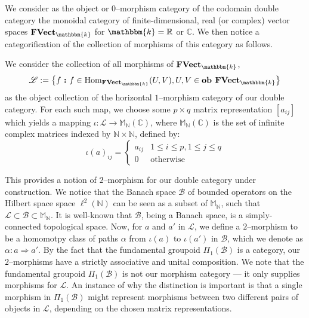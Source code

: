 \documentclass{amsart}
\newcommand{\M}{\mathbb{M}}
\newcommand{\N}{\mathbb{N}}
\newcommand{\R}{\mathbb{R}}
\newcommand{\C}{\mathbb{C}}
\newcommand{\K}{\mathbbm{k}}
\newcommand{\s}{\mathscr}
\renewcommand{\to}[1][]{\stackrel{#1}{\longrightarrow}}
\newcommand{\To}[1][]{\stackrel{#1}{\Longrightarrow}}
\newcommand{\curly}[1]{\left\{ #1 \right\}}
\newcommand{\set}[2][]{\ifthenelse{\equal{#1}{}}
                                  {\curly{#2}}
                                  {\curly{#1\ \textbf{:}\ #2}}}
\newcommand{\FVect}{\textbf{FVect}}
\newcommand{\Hom}{\text{Hom}}
\newcommand{\Ob}{\textbf{ob }}
\numberwithin{thm}{section}
\theoremstyle{definition}
\begin{document}
We consider as the object or $0$--morphism category of the codomain double
category the monoidal category of finite-dimensional, real (or complex) vector
spaces $\FVect_{\K}$ for $\K = \R$ or $\C$. We then notice a categorification
of the collection of morphisms of this category as follows.

We consider the collection of all morphisms of $\FVect_{\K}$,
\[
  \s{L} := \set[f]{f \in \Hom_{\FVect_{\K}}(U, V), U, V \in \Ob \FVect_{\K}}
\]
as the object collection of the horizontal $1$--morphism category of our double
category. For each such map, we choose some $p \times q$ matrix representation
$[a_{ij}]$ which yields a mapping $\iota : \s{L} \to \M_{\N}(\C)$, where
$\M_{\N}(\C)$ is the set of infinite complex matrices indexed by $\N \times \N$,
defined by:
\[
  \iota(a)_{ij} = \begin{cases}
    a_{ij} & 1 \leq i \leq p, 1 \leq j \leq q \\
    0      & \text{otherwise}
  \end{cases}
\]

This provides a notion of $2$--morphism for our double category under
construction. We notice that the Banach space $\s{B}$ of bounded operators on
the Hilbert space space $\ell^2(\N)$ can be seen as a subset of $\M_{\N}$, such
that $\s{L} \subset \s{B} \subset \M_{\N}$. It is well-known that $\s{B}$, being
a Banach space, is a simply-connected topological space. Now, for $a$ and $a'$
in $\s{L}$, we define a $2$--morphism to be a homomotpy class of paths $\alpha$
from $\iota(a)$ to $\iota(a')$ in $\s{B}$, which we denote as
$\alpha : a \To a'$. By the fact that the fundamental groupoid
$\Pi_1(\s{B})$ is a category, our $2$--morphisms have a strictly associative and
unital composition.  We note that the fundamental groupoid $\Pi_1(\s{B})$ is not
our morphism category --- it only supplies morphisms for $\s{L}$. An instance of
why the distinction is important is that a single morphism in $\Pi_1(\s{B})$
might represent morphisms between two different pairs of objects in $\s{L}$,
depending on the chosen matrix representations.
\end{document}
